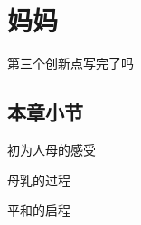 \chapter{妈妈}
\label{ch:contrastive}

第三个创新点写完了吗

\section{本章小节}
\label{sec:contrastive-summary}

初为人母的感受

母乳的过程

平和的启程